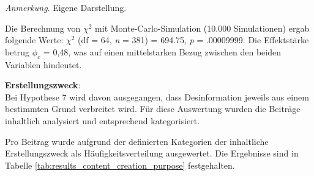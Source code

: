 \documentclass[12pt,a4paper]{article}        %
\begin{document}
\begin{table}[H]
    \caption{\textit{Kreuztabelle zwischen Thematik des Beitrags und des visuellen Artefakts}}
    \label{tab:results_visual_coherence_xtable}
    \centering
\footnotesize\textit{Anmerkung}. Eigene Darstellung.
\end{table}
Die Berechnung von \(\chi^2\) mit Monte-Carlo-Simulation (10.000 Simulationen) ergab folgende Werte: \(\chi^2\) (df = 64, \textit{n} = 381) = 694.75, \textit{p} = .00009999. Die Effektstärke betrug \(\phi_c\) = 0,48,  was auf einen mittelstarken Bezug zwischen den beiden Variablen hindeutet.

\textbf{Erstellungszweck}:\\
Bei Hypothese 7 wird davon ausgegangen, dass Desinformation jeweils aus einem bestimmten Grund verbreitet wird. Für diese Auswertung wurden die Beiträge inhaltlich analysiert und entsprechend kategorisiert.

Pro Beitrag wurde aufgrund der definierten Kategorien der inhaltliche Erstellungszweck als Häufigkeitsverteilung ausgewertet. Die Ergebnisse sind in Tabelle \ref{tab:results_content_creation_purpose} festgehalten.
\end{document}
